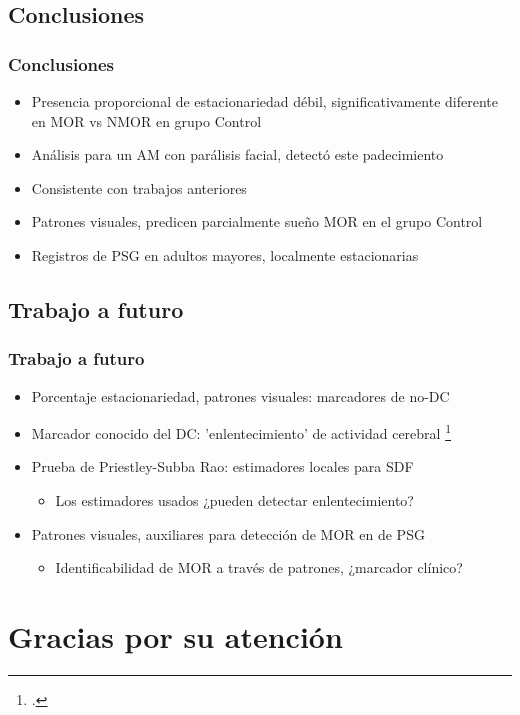 \documentclass[serif,mathserif,professionalfont]{beamer}
\begin{document}

\subsection{Conclusiones}

\begin{frame}\frametitle{Conclusiones}
\begin{itemize}
\item Presencia proporcional de estacionariedad d\'ebil, significativamente diferente en MOR vs 
NMOR en grupo Control

\item An\'alisis para un AM con par\'alisis facial, detect\'o este padecimiento

\item Consistente con trabajos anteriores %

\item Patrones visuales, predicen parcialmente sue\~no MOR en el grupo Control

\item Registros de PSG en adultos mayores, localmente estacionarias
\end{itemize}
\end{frame}


\subsection{Trabajo a futuro}

\begin{frame}\frametitle{Trabajo a futuro}
\begin{itemize}
\item Porcentaje estacionariedad, patrones visuales: marcadores de no-DC

\item Marcador conocido del DC: 'enlentecimiento' de actividad cerebral \footcite{Becerra12} 

\item Prueba de Priestley-Subba Rao: estimadores locales para SDF
\begin{itemize}
\item  Los estimadores usados ¿pueden detectar enlentecimiento?
\end{itemize}

\item Patrones visuales, auxiliares para detecci\'on de MOR en de PSG
\begin{itemize}
\item Identificabilidad de MOR a trav\'es de patrones, ¿marcador cl\'inico?
\end{itemize}
\end{itemize}
\end{frame}



\section*{Gracias por su atención}


\end{document}
